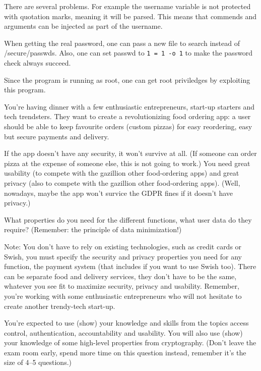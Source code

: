\begin{solution}
  There are several problems.
  For example the username variable is not protected with quotation marks, 
  meaning it will be parsed.
  This means that commends and arguments can be injected as part of the 
  username.

  When getting the real password, one can pass a new file to search instead of 
  /secure/passwds.
  Also, one can set passwd to \verb'1 = 1 -o 1' to make the password check 
  always succeed.

  Since the program is running as root, one can get root priviledges by 
  exploiting this program.
\end{solution}

\question[3]
You're having dinner with a few enthusiastic entrepreneurs, start-up starters 
and tech trendsters.
They want to create a revolutionizing food ordering app:
a user should be able to keep favourite orders (\eg custom pizzas) for easy 
reordering, easy but secure payments and delivery.

If the app doesn't have any security, it won't survive at all.
(If someone can order pizza at the expense of someone else, this is not going 
to work.)
You need great usability (to compete with the gazillion other food-ordering 
apps) and great privacy (also to compete with the gazillion other food-ordering 
apps).
(Well, nowadays, maybe the app won't survice the GDPR fines if it doesn't have 
privacy.)

What properties do you need for the different functions, what user data do they 
require?
(Remember: the principle of data minimization!)

Note: You don't have to rely on existing technologies, such as credit cards or 
Swish, you must specify the security and privacy properties you need for any 
function, \eg the payment system (that includes if you want to use Swish too).
There can be separate food and delivery services, they don't have to be the 
same, whatever you see fit to maximize security, privacy and usability.
Remember, you're working with some enthusiastic entrepreneurs who will not 
hesitate to create another trendy-tech start-up.

You're expected to use (\ie show) your knowledge and skills from the topics 
access control, authentication, accountability and usability.
You will also use (\ie show) your knowledge of some high-level properties from 
cryptography.
(Don't leave the exam room early, spend more time on this question instead, 
remember it's the size of 4--5 questions.)

